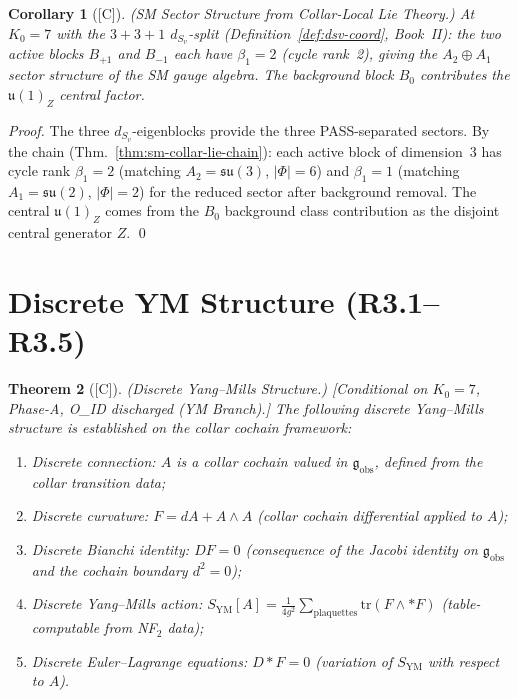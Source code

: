 \documentclass[12pt,oneside]{amsbook}
\theoremstyle{plain}
\newtheorem{theorem}{Theorem}[section]
\newtheorem{corollary}[theorem]{Corollary}
\theoremstyle{definition}
\theoremstyle{remark}
\newcommand{\status}[1]{\textup{[#1]}}
\begin{document}
\begin{corollary}[\status{C}]\label{cor:sm-sector-structure}
\textup{(SM Sector Structure from Collar-Local Lie Theory.)}
At $K_0=7$ with the $3+3+1$ $d_{S_v}$-split
(Definition~\ref{def:dsv-coord}, Book~II): the two active blocks
$B_{+1}$ and $B_{-1}$ each have $\beta_1 = 2$ (cycle rank~2),
giving the $A_2 \oplus A_1$ sector structure of the SM gauge
algebra. The background block $B_0$ contributes the $\mathfrak{u}(1)_Z$
central factor.
\end{corollary}

\begin{proof}
The three $d_{S_v}$-eigenblocks provide the three PASS-separated
sectors. By the chain (Thm.~\ref{thm:sm-collar-lie-chain}): each
active block of dimension~3 has cycle rank $\beta_1 = 2$ (matching
$A_2 = \mathfrak{su}(3)$, $|\Phi| = 6$) and $\beta_1 = 1$ (matching
$A_1 = \mathfrak{su}(2)$, $|\Phi| = 2$) for the reduced sector
after background removal. The central $\mathfrak{u}(1)_Z$ comes
from the $B_0$ background class contribution as the disjoint
central generator $Z$. \qed
\end{proof}

\section{Discrete YM Structure (R3.1--R3.5)}
\label{sec:sm-discrete-ym}

\begin{theorem}[\status{C}]\label{thm:SM-discrete-YM}
\textup{(Discrete Yang--Mills Structure.)}
\textup{[Conditional on $K_0=7$, Phase-A, O\_ID discharged
(YM Branch).]}
The following discrete Yang--Mills structure is established
on the collar cochain framework:
\begin{enumerate}[label=\textup{(R3.\arabic*)}]
 \item \emph{Discrete connection}: $A$ is a collar cochain valued
 in $\mathfrak{g}_{\mathrm{obs}}$, defined from the collar
 transition data;
 \item \emph{Discrete curvature}: $F = dA + A \wedge A$
 (collar cochain differential applied to $A$);
 \item \emph{Discrete Bianchi identity}: $DF = 0$
 (consequence of the Jacobi identity on $\mathfrak{g}_{\mathrm{obs}}$
 and the cochain boundary $d^2 = 0$);
 \item \emph{Discrete Yang--Mills action}:
 $S_{\mathrm{YM}}[A] = \frac{1}{4g^2}\sum_{\text{plaquettes}}
 \mathrm{tr}(F \wedge {*}F)$ (table-computable from NF$_2$ data);
 \item \emph{Discrete Euler--Lagrange equations}: $D{*}F = 0$
 (variation of $S_{\mathrm{YM}}$ with respect to $A$).
\end{enumerate}
\end{theorem}
\end{document}
